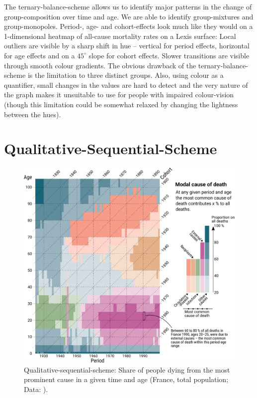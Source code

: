 \documentclass{scrartcl}
\begin{document}
The ternary-balance-scheme allows us to identify major patterns in the change of group-composition over time and age. We are able to identify group-mixtures and group-monopoles. Period-, age- and cohort-effects look much like they would on a 1-dimensional heatmap of all-cause mortality rates on a Lexis surface: Local outliers are visible by a sharp shift in hue -- vertical for period effects, horizontal for age effects and on a $45^{\circ}$ slope for cohort effects. Slower transitions are visible through smooth colour gradients.
The obvious drawback of the ternary-balance-scheme is the limitation to three distinct groups. Also, using colour as a quantifier, small changes in the values are hard to detect and the very nature of the graph makes it unsuitable to use for people with impaired colour-vision (though this limitation could be somewhat relaxed by changing the lightness between the hues).

\clearpage

\section{Qualitative-Sequential-Scheme} %
\label{sec:qss}

\begin{figure}[!htb]
  \centering
  \includegraphics[width = 0.8\linewidth]{../fig/qual_seq.pdf}
  \caption{Qualitative-sequential-scheme: Share of people dying from the most prominent cause in a given time and age (France, total population; Data: \cite{Vallin2014}).}
  \label{fig:qss}
\end{figure}
\end{document}
